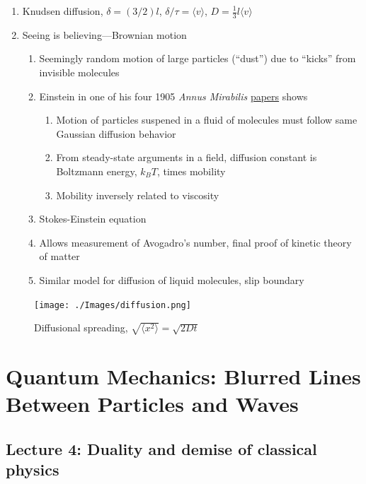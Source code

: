 \documentclass[11pt]{article}
\begin{document}
\begin{enumerate}
\begin{enumerate}
\end{enumerate}
\item Knudsen diffusion, \(\delta = (3/2)l\), \(\delta/\tau = \langle v \rangle\), \(D=\frac{1}{3}l \langle v \rangle\)
\item Seeing is believing---Brownian motion
\begin{enumerate}
\item Seemingly random motion of large particles (``dust'') due to ``kicks'' from invisible molecules
\item Einstein in one of his four 1905 \emph{Annus Mirabilis} \href{https://einsteinpapers.press.princeton.edu/vol2-trans/137}{papers} shows
\begin{enumerate}
\item Motion of particles suspened in a fluid of molecules must
follow same Gaussian diffusion behavior
\item From steady-state arguments in a field, diffusion constant is Boltzmann energy, \(k_B T\), times mobility
\item Mobility inversely related to viscosity
\end{enumerate}
\item Stokes-Einstein equation
\item Allows measurement of Avogadro's number, final proof of kinetic theory of matter
\item Similar model for diffusion of liquid molecules, slip boundary
\end{enumerate}
\end{enumerate}

\begin{figure}[htbp]
\centering
\texttt{[image: ./Images/diffusion.png]}
\caption{Diffusional spreading, \(\sqrt{\langle x^2 \rangle} = \sqrt{2 D t}\)}
\end{figure}
\section{Quantum Mechanics: Blurred Lines Between Particles and Waves}
\label{sec:orgec4efbd}
\subsection{Lecture 4: Duality and demise of classical physics}
\label{sec:org32bab33}
\end{document}
